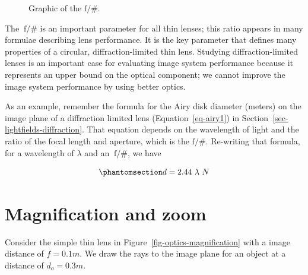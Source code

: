 \documentclass[
  letterpaper,
]{book}
\begin{document}
\begin{figure}


\caption{\label{fig-fnumber}Graphic of the \(\mathrm{f}/\#\).}

\end{figure}%

The \(~\mathrm{f}/\#\) is an important parameter for all thin lenses;
this ratio appears in many formulae describing lens performance. It is
the key parameter that defines many properties of a circular,
diffraction-limited thin lens. Studying diffraction-limited lenses is an
important case for evaluating image system performance because it
represents an upper bound on the optical component; we cannot improve
the image system performance by using better optics.

As an example, remember the formula for the Airy disk diameter (meters)
on the image plane of a diffraction limited lens
(Equation~\ref{eq-airy1}) in Section~\ref{sec-lightfields-diffraction}.
That equation depends on the wavelength of light and the ratio of the
focal length and aperture, which is the \(\mathrm{f}/\#\). Re-writing
that formula, for a wavelength of \(\lambda\) and an \(~\mathrm{f}/\#\),
we have

\begin{equation}\phantomsection\label{eq-airy2}{ 
d = 2.44 ~ \lambda ~ N
}\end{equation}

\section{Magnification and zoom}\label{sec-optics-zoom}

Consider the simple thin lens in Figure~\ref{fig-optics-magnification}
with a image distance of \(f = 0.1m\). We draw the rays to the image
plane for an object at a distance of \(d_o = 0.3m\).
\end{document}
